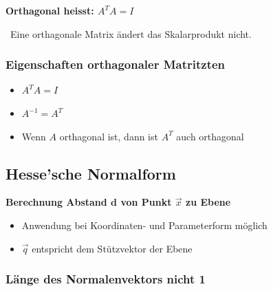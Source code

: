 \textbf{Orthagonal heisst: $A^T A = I$}

\textrightarrow\ Eine orthagonale Matrix ändert das Skalarprodukt nicht.

\subsubsection{Eigenschaften orthagonaler Matritzten}

\begin{minipage}[t]{0.15\columnwidth}
	\begin{itemize}
		\item $A^T A = I$
	\end{itemize}
\end{minipage}
\hfill
\begin{minipage}[t]{0.18\columnwidth}
	\begin{itemize}
		\item $A^{-1} = A^T$
	\end{itemize}
\end{minipage}
\hfill
\begin{minipage}[t]{0.65\columnwidth}
	\begin{itemize}
		\item Wenn $A$ orthagonal ist, dann ist $A^T$ auch orthagonal
	\end{itemize}
\end{minipage}


\subsection{Hesse'sche Normalform}

\textbf{Berechnung Abstand $\bm{d}$ von Punkt $\vec{x}$ zu Ebene}
\vspace{0.2cm}

\begin{itemize}
    \item Anwendung bei Koordinaten- und Parameterform möglich
    \item $\vec{q}$ entspricht dem Stützvektor der Ebene
\end{itemize}
\vspace{0.2cm}

\subsubsection{Länge des Normalenvektors nicht 1}

